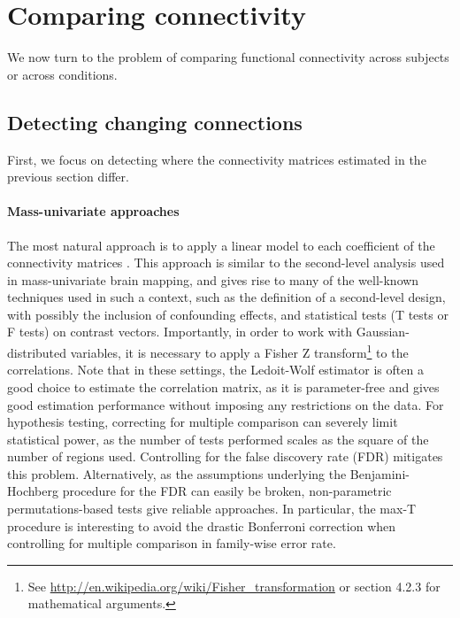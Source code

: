 \documentclass[5p]{elsarticle}
\begin{document}




\section{Comparing connectivity}

We now turn to the problem of comparing functional
connectivity across subjects or across conditions.

\subsection{Detecting changing connections}

First, we focus on detecting where the connectivity matrices estimated in
the previous section differ.

\paragraph{Mass-univariate approaches}
The most natural approach is to apply a linear model to each coefficient of
the connectivity matrices \cite{lewis2009,grillon2012}. This
approach is similar to the second-level analysis used in mass-univariate
brain mapping, and gives rise to many of the well-known techniques
used in such a context, such as the definition of a second-level design,
with possibly the inclusion of confounding effects, and statistical tests
(T tests or F tests) on contrast vectors. Importantly, in order to work
with Gaussian-distributed variables, it is necessary to apply a Fisher
Z transform\footnote{See
\url{http://en.wikipedia.org/wiki/Fisher_transformation} or
\cite{anderson1958} section 4.2.3 for mathematical arguments.} to the
correlations. Note that
in these settings, the Ledoit-Wolf estimator \cite{ledoit2004} is
often a good choice to estimate the correlation matrix, as it is
parameter-free and gives good estimation performance without imposing any
restrictions on the data.
%
For hypothesis testing,
correcting for multiple comparison can severely limit statistical
power, as the number of tests performed scales as the square of the
number of regions used. Controlling for the false discovery rate (FDR)
mitigates this problem. Alternatively, as the assumptions underlying the
Benjamini-Hochberg procedure \cite{benjamini1995} for the FDR can easily
be broken, non-parametric permutations-based tests give reliable
approaches. In particular, the max-T procedure \cite{ge2003,nichols2001}
is interesting to avoid the drastic Bonferroni correction when
controlling for multiple comparison in family-wise error rate.
\end{document}
